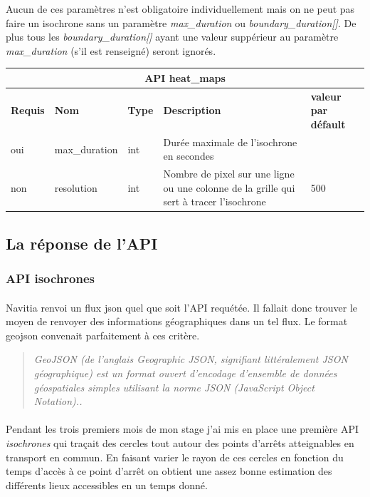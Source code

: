 \documentclass[a4paper]{report}
\begin{document}
Aucun de ces paramètres n'est obligatoire individuellement mais on ne peut pas faire un isochrone sans un paramètre \emph{max\_duration} ou \emph{boundary\_duration[]}. De plus tous les \emph{boundary\_duration[]} ayant une valeur suppérieur au paramètre \emph{max\_duration} (s'il est renseigné) seront ignorés. 

\begin{center}
	\begin{tabular}{|l|l|p{1.5cm}|p{6cm}|l|}
	\hline
	\multicolumn{5}{|c|}{\cellcolor{LightCyan} \textbf{API heat\_maps}} \\
	\hline
	\textbf{Requis} & \textbf{Nom} & \textbf{Type} & \textbf{Description} &  \textbf{valeur par défault} \\
	\hline
	oui & max\_duration & int & Durée maximale de l'isochrone en secondes &\\
	\hline
	non & resolution & int & Nombre de pixel sur une ligne ou une colonne de la grille qui sert à tracer l'isochrone & 500\\
	\hline
	\end{tabular}
\end{center}

\subsection{La réponse de l'API}

\subsubsection{API isochrones} 

\paragraph{}Navitia renvoi un flux json quel que soit l'API requétée. Il fallait donc trouver le moyen de renvoyer des informations géographiques dans un tel flux. Le format geojson convenait parfaitement à ces critère.

\begin{quote}
	\emph{GeoJSON (de l'anglais Geographic JSON, signifiant littéralement JSON géographique) est un format ouvert d'encodage d'ensemble de données géospatiales simples utilisant la norme JSON (JavaScript Object Notation).\cite{ref}.}
\end{quote}


\paragraph{} Pendant les trois premiers mois de mon stage j'ai mis en place une première API \emph{isochrones} qui traçait des cercles tout autour des points d'arrêts atteignables en transport en commun. En faisant varier le rayon de ces cercles en fonction du temps d'accès à ce point d'arrêt on obtient une assez bonne estimation des différents lieux accessibles en un temps donné.
\end{document}
